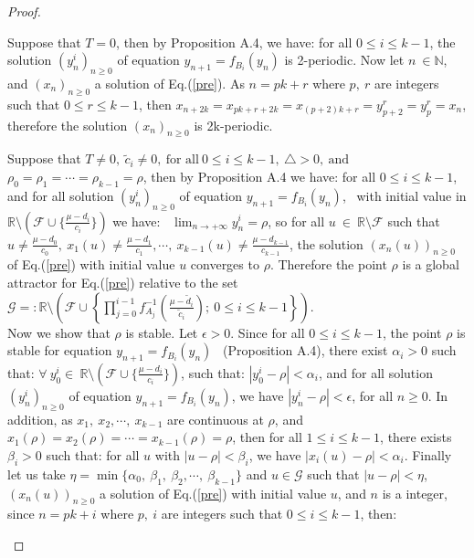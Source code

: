 \documentclass[11pt]{amsart}
\theoremstyle{definition}
\theoremstyle{remark}
\theoremstyle{example}
\numberwithin{equation}{section}
\begin{document}
\begin{proof} \begin{description}[leftmargin=*]
\item[(1)] Suppose that $T=0$, then by Proposition A.4, we have: for all $0\leq i\leq k-1$,
the solution $(y_n^i)_{n\geq0}$ of equation $y_{n+1}=f_{B_i}(y_n)$ is 2-periodic.
Now let $n \ \in \mathbb{N}$, and $(x_n)_{n\geq0}$ a solution of Eq.(\ref{pre}). As $n=pk+r$ where $p, \ r$ are integers such that $0\leq r\leq k-1$, then
$x_{n+2k}=x_{pk+r+2k}=x_{(p+2)k+r}=y_{p+2}^r=y_p^r=x_n$, therefore the solution $(x_n)_{n\geq0}$ is 2k-periodic.
\medskip

\item[(2-1)-(i)] Suppose that $T\neq0, \ \tilde{c}_i\neq0, \ \text{for all} \ 0\leq i\leq k-1, \ \triangle>0, \ \text{and}$\\ $\rho_0=\rho_1=\cdots=\rho_{k-1}=\rho$, then by Proposition A.4 we have: for all $0\leq i\leq k-1$, and for all solution $(y_n^i)_{n\geq0}$ of equation $y_{n+1}=f_{B_i}(y_n)$, \
with initial value in $\mathbb{R}\setminus(\mathcal{F}\cup\{\frac{\mu-d_i}{c_i}\})$ we have:
\ $\displaystyle{\lim_{n\rightarrow+\infty}y_n^i=\rho}$, so for all $u\ \in\ \mathbb{R}\setminus\mathcal{F}$ such that
$u\neq\frac{\mu-d_0}{c_0}, \ x_1(u)\neq \frac{\mu-d_1}{c_1},\cdots, \ x_{k-1}(u)\neq \frac{\mu-d_{k-1}}{c_{k-1}}$,
the solution $(x_n(u))_{n\geq0}$ of Eq.(\ref{pre}) with initial value $u$ converges to $\rho$. Therefore the point
$\rho$ is a global attractor for Eq.(\ref{pre}) relative to the set\\
 $\mathcal{G}=:\mathbb{R}\setminus\left(\mathcal{F}\cup\left\{\prod\limits_{j=0}^{i-1}f_{A_j}^{-1}(
\frac{\mu-\tilde{d}_{i}}{\tilde{c}_{i}}); \ 0\leq i\leq k-1\right\}\right)$.\\
\noindent
Now we show that $\rho$ is stable. Let $\epsilon>0$. Since for all $0\leq i\leq k-1$, the point $\rho$ is stable
for equation $y_{n+1}=f_{B_i}(y_n)$ \ (Proposition A.4), there exist $\alpha_i>0$ such that:
$\forall\ y_0^i \in\ \mathbb{R}\setminus(\mathcal{F}\cup\{\frac{\mu-d_i}{c_i}\})$, such that: $|y_0^i-\rho|<\alpha_i$,
and for all solution $(y_n^i)_{n\geq0}$ of equation $y_{n+1}=f_{B_i}(y_n)$, we have $|y_n^i-\rho|<\epsilon$,
for all
$n\geq0$. In addition, as $x_1, \ x_2,\cdots, \ x_{k-1}$ are continuous at $\rho$,
and $ x_1(\rho)= x_2(\rho)=\cdots=x_{k-1}(\rho)=\rho$, then for all $1\leq i\leq k-1$, there exists
$\beta_i>0$ such that: for all $u$ with $|u-\rho|<\beta_i$, we have $|x_i(u)-\rho|<\alpha_i$. Finally let us take
$\eta=\min\{\alpha_0, \ \beta_1, \ \beta_2,\cdots, \ \beta_{k-1}\}$ and $u \in \mathcal{G}$ such that $|u-\rho|<\eta$, \ $(x_n(u))_{n\geq0}$ a solution of Eq.(\ref{pre}) with initial value $u$, and $n$ is a integer, since $n=pk+i$ where $p, \ i$ are integers such that $0\leq i\leq k-1$, then:

\end{description}
\end{proof}
\end{document}
